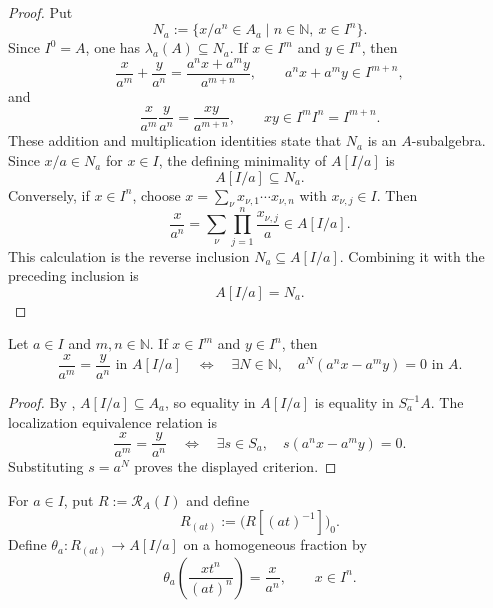 \begin{proof}
  Put
  \[
    N_a:=\{x/a^n\in A_a\mid n\in\mathbb N,\ x\in I^n\}.
  \]
  Since $I^0=A$, one has $\lambda_a(A)\subseteq N_a$.  If
  $x\in I^m$ and $y\in I^n$, then
  \[
    \frac{x}{a^m}+\frac{y}{a^n}
      =\frac{a^nx+a^my}{a^{m+n}},
    \qquad a^nx+a^my\in I^{m+n},
  \]
  and
  \[
    \frac{x}{a^m}\frac{y}{a^n}
      =\frac{xy}{a^{m+n}},
    \qquad xy\in I^mI^n=I^{m+n}.
  \]
  These addition and multiplication identities state that $N_a$ is an
  $A$-subalgebra.  Since $x/a\in N_a$ for $x\in I$, the defining minimality
  of $A[I/a]$ is
  \[
    A[I/a]\subseteq N_a.
  \]
  Conversely, if $x\in I^n$, choose
  $x=\sum_\nu x_{\nu,1}\cdots x_{\nu,n}$ with $x_{\nu,j}\in I$.  Then
  \[
    \frac{x}{a^n}
      =\sum_\nu\prod_{j=1}^n\frac{x_{\nu,j}}a\in A[I/a].
  \]
  This calculation is the reverse inclusion
  $N_a\subseteq A[I/a]$.  Combining it with the preceding inclusion is
  \[
    A[I/a]=N_a.
  \]
\end{proof}

\begin{lemma}
  \label{lemma:nagata-chart-ring-fraction-equality}
  \lean{}

  Let $a\in I$ and $m,n\in\mathbb N$.  If $x\in I^m$ and $y\in I^n$, then
  \[
    \frac{x}{a^m}=\frac{y}{a^n}\text{ in }A[I/a]
    \quad\Longleftrightarrow\quad
    \exists N\in\mathbb N,\quad
      a^N(a^nx-a^my)=0\text{ in }A.
  \]
\end{lemma}

\begin{proof}
  By , $A[I/a]\subseteq A_a$, so equality
  in $A[I/a]$ is equality in $S_a^{-1}A$.  The localization equivalence
  relation is
  \[
    \frac{x}{a^m}=\frac{y}{a^n}
    \quad\Longleftrightarrow\quad
    \exists s\in S_a,\quad s(a^nx-a^my)=0.
  \]
  Substituting $s=a^N$ proves the displayed criterion.
\end{proof}

\begin{definition}
  \label{def:nagata-homogeneous-away-to-chart}
  \lean{}

  For $a\in I$, put $R:=\mathcal R_A(I)$ and define
  \[
    R_{(at)}:=\bigl(R[(at)^{-1}]\bigr)_0.
  \]
  Define $\theta_a\colon R_{(at)}\to A[I/a]$ on a homogeneous fraction by
  \[
    \theta_a\!\left(\frac{xt^n}{(at)^n}\right)=\frac{x}{a^n},
    \qquad x\in I^n.
  \]
\end{definition}


